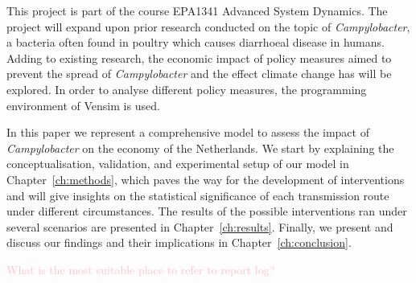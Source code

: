 This project is part of the course EPA1341 Advanced System Dynamics. The project will expand upon prior research conducted on the topic of \textit{Campylobacter}, a bacteria often found in poultry which causes diarrhoeal disease in humans. Adding to existing research, the economic impact of policy measures aimed to prevent the spread of  \textit{Campylobacter} and the effect climate change has will be explored. In order to analyse different policy measures, the programming environment of Vensim is used. 

In this paper we represent a comprehensive model to assess the impact of \textit{Campylobacter} on the economy of the Netherlands. We start by explaining the conceptualisation, validation, and experimental setup of our model in Chapter~\ref{ch:methods}, which paves the way for the development of interventions and will give insights on the statistical significance of each transmission route under different circumstances. The results of the possible interventions ran under several scenarios are presented in Chapter~\ref{ch:results}. Finally, we present and discuss our findings and their implications in Chapter~\ref{ch:conclusion}.


{\Huge \textcolor{pink}{What is the most suitable place to refer to report log?}}